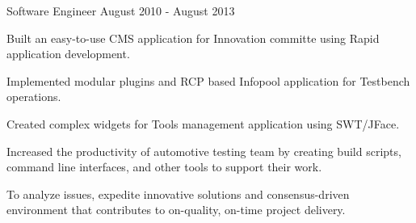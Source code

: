 \begin{cventries}
    \begin{cventries}
      \cventry
        {Software Engineer}
        {}
        {}
        {August 2010 - August 2013}
        {
          \begin{cvitems}
            \item {Built an easy-to-use CMS application for Innovation committe using Rapid application development.}
            \item {Implemented modular plugins and RCP based Infopool application for Testbench operations.}
            \item {Created complex widgets for Tools management application using SWT/JFace.}
            \item {Increased the productivity of automotive testing team by creating build scripts, command line interfaces, and other tools to support their work.}
            \item {To analyze issues, expedite innovative solutions and consensus-driven environment that contributes to on-quality, on-time project delivery.}
          \end{cvitems}
        }
    \end{cventries}

\end{cventries}
